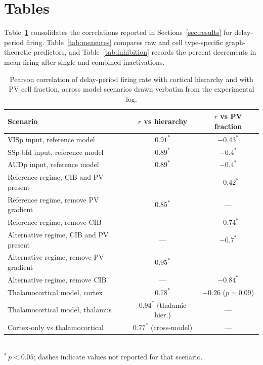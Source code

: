 \documentclass[11pt]{article}
\begin{document}
\section{Tables}

Table~\ref{tab:correlations} consolidates the correlations reported in Sections~\ref{sec:results} for delay-period firing. Table~\ref{tab:measures} compares raw and cell type-specific graph-theoretic predictors, and Table~\ref{tab:inhibition} records the percent decrements in mean firing after single and combined inactivations.

\begin{table}[htbp]
\centering
\caption{Pearson correlation of delay-period firing rate with cortical hierarchy and with PV cell fraction, across model scenarios drawn verbatim from the experimental log.}
\label{tab:correlations}
\begin{tabular}{lcc}
\toprule
Scenario & $r$ vs hierarchy & $r$ vs PV fraction \\
\midrule
VISp input, reference model & $0.91^{*}$ & $-0.43^{*}$ \\
SSp-bfd input, reference model & $0.89^{*}$ & $-0.4^{*}$ \\
AUDp input, reference model & $0.89^{*}$ & $-0.4^{*}$ \\
Reference regime, CIB and PV present & --- & $-0.42^{*}$ \\
Reference regime, remove PV gradient & $0.85^{*}$ & --- \\
Reference regime, remove CIB & --- & $-0.74^{*}$ \\
Alternative regime, CIB and PV present & --- & $-0.7^{*}$ \\
Alternative regime, remove PV gradient & $0.95^{*}$ & --- \\
Alternative regime, remove CIB & --- & $-0.84^{*}$ \\
Thalamocortical model, cortex & $0.78^{*}$ & $-0.26$ ($p=0.09$) \\
Thalamocortical model, thalamus & $0.94^{*}$ (thalamic hier.) & --- \\
Cortex-only vs thalamocortical & $0.77^{*}$ (cross-model) & --- \\
\bottomrule
\end{tabular}
\\[0.3em]
\small{$^{*}\,p<0.05$; dashes indicate values not reported for that scenario.}
\end{table}
\end{document}

